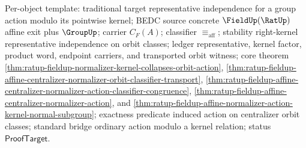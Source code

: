 Per-object template: traditional target representative independence for a
group action modulo its pointwise kernel; BEDC source concrete
$\FieldUp(\RatUp)$ affine exit plus $\GroupUp$; carrier $C_F(A)$; classifier
$\equiv_{\mathrm{aff}}$; stability right-kernel representative independence
on orbit classes; ledger representative, kernel factor, product word,
endpoint carriers, and transported orbit witness; core theorem
\autoref{thm:ratup-fieldup-normalizer-kernel-collapses-orbit-action},
\autoref{thm:ratup-fieldup-affine-centralizer-normalizer-orbit-classifier-transport},
\autoref{thm:ratup-fieldup-affine-centralizer-normalizer-action-classifier-congruence},
\autoref{thm:ratup-fieldup-affine-centralizer-normalizer-action}, and
\autoref{thm:ratup-fieldup-affine-normalizer-action-kernel-normal-subgroup};
exactness predicate induced action on centralizer orbit classes; standard
bridge ordinary action modulo a kernel relation; status
$\mathsf{ProofTarget}$.
